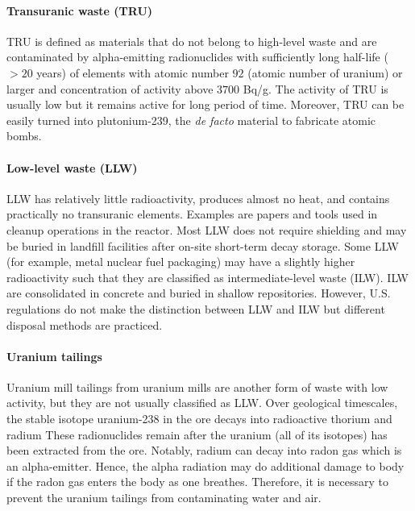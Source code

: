 \documentclass[nofootinbib,preprint,aps]{revtex4-1}
\begin{document}
    \paragraph{Transuranic waste (TRU)}
    TRU is defined as materials that do not belong to high-level waste and are
    contaminated by alpha-emitting radionuclides with
    sufficiently long half-life ($>20$ years) of elements with atomic number $92$ (atomic number of uranium)
    or larger and concentration of activity above $3700$ Bq/g.\cite{j83,s01} The activity
    of TRU is usually low but it remains active for long period of time. Moreover, TRU can be easily turned
    into plutonium-239, the {\it de facto} material to fabricate atomic bombs.

    \paragraph{Low-level waste (LLW)}
    LLW has relatively little radioactivity, produces almost no heat,
    and contains practically no
    transuranic elements. Examples are papers and tools used in cleanup operations in the reactor.
    Most LLW does not require shielding and may be buried in landfill 
    facilities after on-site short-term decay storage.
    Some LLW (for example, metal nuclear fuel packaging) may have a slightly
    higher radioactivity such that they are classified
    as intermediate-level waste (ILW). ILW are consolidated in concrete and buried in shallow
    repositories.\cite{s01} However, U.S. regulations do not make the distinction
    between LLW and ILW but different disposal methods are practiced.\cite{nrc09, s01}

    \paragraph{Uranium tailings}
    Uranium mill tailings from uranium mills are another form of waste with low activity, but
    they are not usually classified as LLW.
    Over geological timescales, the stable isotope uranium-238 
    in the ore decays into radioactive thorium and radium 
    These radionuclides remain after the uranium (all of its isotopes)
    has been extracted from the ore. Notably, radium
    can decay into radon gas which is an alpha-emitter. Hence, the alpha radiation may do additional
    damage to body if the radon gas enters the body as one breathes.
    Therefore, it is necessary to prevent the uranium tailings
    from contaminating water and air.
    
\end{document}
